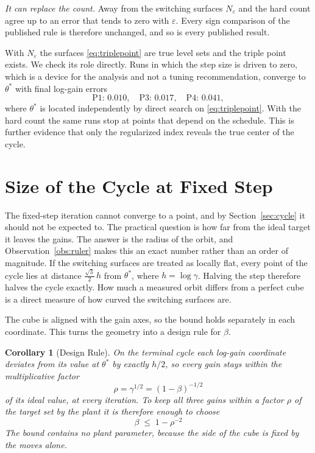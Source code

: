 \documentclass[letterpaper, 10pt, conference, twocolumn]{ieeeconf}
\newtheorem{corollary}{Corollary}
\newcommand{\Neps}{N_{\varepsilon}}
\begin{document}
\emph{It can replace the count.} Away from the switching surfaces $\Neps$ and
the hard count agree up to an error that tends to zero with $\varepsilon$.
Every sign comparison of the published rule is therefore unchanged, and so is
every published result.

With $\Neps$ the surfaces \eqref{eq:triplepoint} are true level sets and the
triple point exists. We check its role directly. Runs in which the step size is
driven to zero, which is a device for the analysis and not a tuning
recommendation, converge to $\theta^*$ with final log-gain errors
\begin{equation*}
\text{P1: } 0.010, \quad \text{P3: } 0.017, \quad \text{P4: } 0.041,
\end{equation*}
where $\theta^*$ is located independently by direct search on
\eqref{eq:triplepoint}. With the hard count the same runs stop at points that
depend on the schedule. This is further evidence that only the regularized
index reveals the true center of the cycle.

\section{Size of the Cycle at Fixed Step}
\label{sec:size}

The fixed-step iteration cannot converge to a point, and by
Section~\ref{sec:cycle} it should not be expected to. The practical question is
how far from the ideal target it leaves the gains. The answer is the radius of
the orbit, and Observation~\ref{obs:ruler} makes this an exact number rather
than an order of magnitude. If the switching surfaces are treated as locally
flat, every point of the cycle lies at distance $\tfrac{\sqrt{3}}{2}\, h$ from
$\theta^*$, where $h = \log\gamma$. Halving the step therefore halves the
cycle exactly. How much a measured orbit differs from a perfect cube is a
direct measure of how curved the switching surfaces are.

The cube is aligned with the gain axes, so the bound holds separately in each
coordinate. This turns the geometry into a design rule for $\beta$.

\begin{corollary}[Design Rule]
\label{cor:design}
On the terminal cycle each log-gain coordinate deviates from its value at
$\theta^*$ by exactly $h/2$, so every gain stays within the multiplicative
factor
\begin{equation}
\rho = \gamma^{1/2} = (1-\beta)^{-1/2}
\label{eq:designfwd}
\end{equation}
of its ideal value, at every iteration. To keep all three gains within a
factor $\rho$ of the target set by the plant it is therefore enough to choose
\begin{equation}
\boxed{\;\beta \;\le\; 1 - \rho^{-2}\;}
\label{eq:designrule}
\end{equation}
The bound contains no plant parameter, because the side of the cube is fixed
by the moves alone.
\end{corollary}
\end{document}
